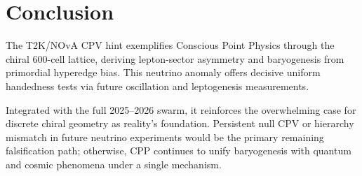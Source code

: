 \documentclass[11pt]{article}
\begin{document}
\section{Conclusion}
The T2K/NOvA CPV hint exemplifies Conscious Point Physics through the chiral 600-cell lattice, deriving lepton-sector asymmetry and baryogenesis from primordial hyperedge bias. This neutrino anomaly offers decisive uniform handedness tests via future oscillation and leptogenesis measurements.  

Integrated with the full 2025--2026 swarm, it reinforces the overwhelming case for discrete chiral geometry as reality's foundation. Persistent null CPV or hierarchy mismatch in future neutrino experiments would be the primary remaining falsification path; otherwise, CPP continues to unify baryogenesis with quantum and cosmic phenomena under a single mechanism.
\end{document}
